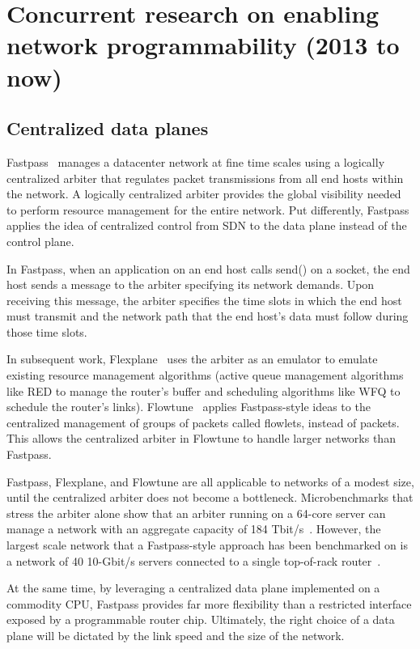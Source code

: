 \section{Concurrent research on enabling network programmability (2013 to now)}
\label{s:concurrent}

\subsection{Centralized data planes}
Fastpass~\cite{fastpass} manages a datacenter network at fine time scales using
a logically centralized arbiter that regulates packet transmissions from all
end hosts within the network. A logically centralized arbiter provides the
global visibility needed to perform resource management for the entire network.
Put differently, Fastpass applies the idea of centralized control from SDN to
the data plane instead of the control plane.

In Fastpass, when an application on an end host calls send() on a socket, the
end host sends a message to the arbiter specifying its network demands. Upon
receiving this message, the arbiter specifies the time slots in which the end
host must transmit and the network path that the end host's data must follow
during those time slots. 

In subsequent work, Flexplane~\cite{flexplane} uses the arbiter as an emulator
to emulate existing resource management algorithms (\eg active queue management
algorithms like RED to manage the router's buffer and scheduling algorithms
like WFQ to schedule the router's links).  Flowtune~\cite{flowtune} applies
Fastpass-style ideas to the centralized management of groups of packets called
flowlets, instead of packets.  This allows the centralized arbiter in Flowtune
to handle larger networks than Fastpass.

Fastpass, Flexplane, and Flowtune are all applicable to networks of a modest
size, until the centralized arbiter does not become a bottleneck.
Microbenchmarks that stress the arbiter alone show that an arbiter running on a
64-core server can manage a network with an aggregate capacity of 184
Tbit/s~\cite{flowtune}. However, the largest scale network that a
Fastpass-style approach has been benchmarked on is a network of 40 10-Gbit/s
servers connected to a single top-of-rack router~\cite{flexplane}.

At the same time, by leveraging a centralized data plane implemented on a
commodity CPU, Fastpass provides far more flexibility than a restricted
interface exposed by a programmable router chip.  Ultimately, the right choice
of a data plane will be dictated by the link speed and the size of the network.

